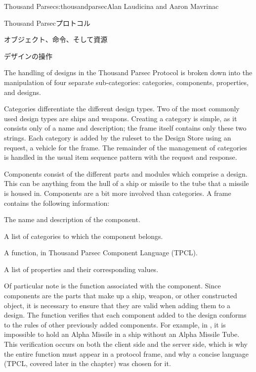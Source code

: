 \begin{aosachapter}{Thousand Parsec}{s:thousandparsec}{Alan Laudicina and Aaron Mavrinac}
\begin{aosasect1}{Thousand Parsecプロトコル}
\begin{aosasect2}{オブジェクト、命令、そして資源}
\end{aosasect2}

\begin{aosasect2}{デザインの操作}

The handling of designs in the Thousand Parsec Protocol is broken down
into the manipulation of four separate sub-categories: categories,
components, properties, and designs.

Categories differentiate the different design types. Two of the most
commonly used design types are ships and weapons. Creating a category
is simple, as it consists only of a name and description; the
 frame itself contains only these two strings. Each
category is added by the ruleset to the Design Store using an
 request, a vehicle for the 
frame. The remainder of the management of categories is handled in the
usual item sequence pattern with the  request
and  response.

Components consist of the different parts and modules which comprise a
design. This can be anything from the hull of a ship or missile to the
tube that a missile is housed in. Components are a bit more involved
than categories. A  frame contains the following
information:

\begin{aosaitemize}

  \item The name and description of the component.

  \item A list of categories to which the component belongs.

  \item A  function, in Thousand Parsec Component
  Language (TPCL).

  \item A list of properties and their corresponding values.

\end{aosaitemize}

Of particular note is the  function associated with
the component. Since components are the parts that make up a ship,
weapon, or other constructed object, it is necessary to ensure that
they are valid when adding them to a design. The 
function verifies that each component added to the design conforms to
the rules of other previously added components. For example, in
, it is impossible to hold an Alpha
Missile in a ship without an Alpha Missile Tube. This verification
occurs on both the client side and the server side, which is why the
entire function must appear in a protocol frame, and why a concise
language (TPCL, covered later in the chapter) was chosen for it.


\end{aosasect2}
\end{aosasect1}
\end{aosachapter}
